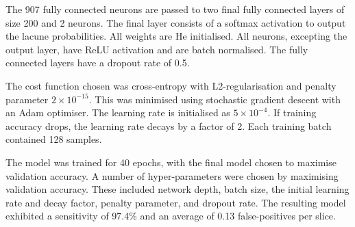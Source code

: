 The 907 fully connected neurons are passed to two final fully connected layers of size 200 and 2 neurons. The final layer consists of a softmax activation to output the lacune probabilities. All weights are He initialised. All neurons, excepting the output layer, have ReLU activation and are batch normalised. The fully connected layers have a dropout rate of 0.5. 

The cost function chosen was cross-entropy with L2-regularisation and penalty parameter $2\times10^{-15}$. This was minimised using stochastic gradient descent with an Adam optimiser. The learning rate is initialised as $5\times10^{-4}$. If training accuracy drops, the learning rate decays by a factor of 2. Each training batch contained 128 samples.

The model was trained for 40 epochs, with the final model chosen to maximise validation accuracy. A number of hyper-parameters were chosen by maximising validation accuracy. These included network depth, batch size, the initial learning rate and decay factor, penalty parameter, and dropout rate. The resulting model exhibited a sensitivity of 97.4\% and an average of 0.13 false-positives per slice.




